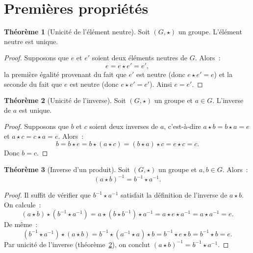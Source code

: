 \documentclass[12pt,a4paper,openany]{book}
\theoremstyle{definition}
\newtheorem{theoreme}{Théorème}[chapter]
\begin{document}
\section{Premières propriétés}
\label{sec:ch1-premieres-proprietes}

\begin{theoreme}[Unicité de l'élément neutre]
\label{thm:unicite-neutre}
Soit $(G, \star)$ un groupe. L'élément neutre est unique.
\end{theoreme}

\begin{proof}
Supposons que $e$ et $e'$ soient deux éléments neutres de $G$. Alors~:
\[
  e = e \star e' = e',
\]
la première égalité provenant du fait que $e'$ est neutre (donc $e \star e' = e$) et la
seconde du fait que $e$ est neutre (donc $e \star e' = e'$). Ainsi $e = e'$.
\end{proof}

\begin{theoreme}[Unicité de l'inverse]
\label{thm:unicite-inverse}
Soit $(G, \star)$ un groupe et $a \in G$. L'inverse de $a$ est unique.
\end{theoreme}

\begin{proof}
Supposons que $b$ et $c$ soient deux inverses de $a$, c'est-à-dire $a \star b = b \star
a = e$ et $a \star c = c \star a = e$. Alors~:
\[
  b = b \star e = b \star (a \star c) = (b \star a) \star c = e \star c = c.
\]
Donc $b = c$.
\end{proof}

\begin{theoreme}[Inverse d'un produit]
\label{thm:inverse-produit}
Soit $(G, \star)$ un groupe et $a, b \in G$. Alors~:
\[
  (a \star b)^{-1} = b^{-1} \star a^{-1}.
\]
\end{theoreme}

\begin{proof}
Il suffit de vérifier que $b^{-1} \star a^{-1}$ satisfait la définition de l'inverse de
$a \star b$. On calcule~:
\[
  (a \star b) \star (b^{-1} \star a^{-1})
  = a \star (b \star b^{-1}) \star a^{-1}
  = a \star e \star a^{-1}
  = a \star a^{-1}
  = e.
\]
De même~:
\[
  (b^{-1} \star a^{-1}) \star (a \star b)
  = b^{-1} \star (a^{-1} \star a) \star b
  = b^{-1} \star e \star b
  = b^{-1} \star b
  = e.
\]
Par unicité de l'inverse (théorème~\ref{thm:unicite-inverse}), on conclut
$(a \star b)^{-1} = b^{-1} \star a^{-1}$.
\end{proof}
\end{document}
